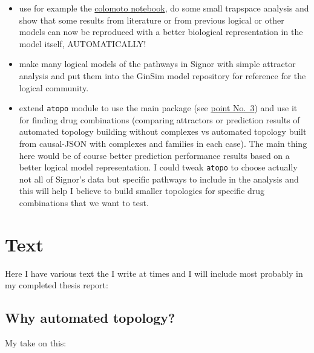 \documentclass[
  12pt,
]{book}
\providecommand{\tightlist}{%
  \setlength{\itemsep}{0pt}\setlength{\parskip}{0pt}}
\begin{document}
\begin{enumerate}
  \begin{itemize}
  \tightlist
  \item
    use for example the \href{https://github.com/colomoto/colomoto-docker}{colomoto notebook}, do some small trapspace analysis and show that some results from literature or from previous logical or other models can now be reproduced with a better biological representation in the model itself, AUTOMATICALLY!
  \item
    make many logical models of the pathways in Signor with simple attractor analysis and put them into the GinSim model repository for reference for the logical community.
  \item
    extend \texttt{atopo} module to use the main package (see \protect\hyperlink{causalJSONPoint3}{point No.~3}) and use it for finding drug combinations (comparing attractors or prediction results of automated topology building without complexes vs automated topology built from causal-JSON with complexes and families in each case).
    The main thing here would be of course better prediction performance results based on a better logical model representation.
    I could tweak \texttt{atopo} to choose actually not all of Signor's data but specific pathways to include in the analysis and this will help I believe to build smaller topologies for specific drug combinations that we want to test.
  \end{itemize}
\end{enumerate}

\hypertarget{text}{%
\chapter{Text}\label{text}}

Here I have various text the I write at times and I will include most probably in my completed thesis report:

\hypertarget{why-automated-topology}{%
\section{Why automated topology?}\label{why-automated-topology}}

My take on this:
\end{document}
